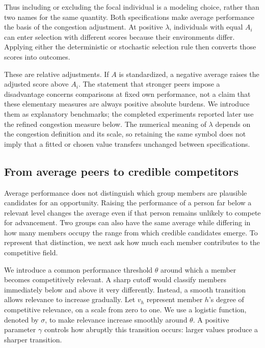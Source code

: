 Thus including or excluding the focal individual is a modeling choice, rather than two names for the same quantity. Both specifications make average performance the basis of the congestion adjustment. At positive \(\lambda\), individuals with equal \(A_i\) can enter selection with different scores because their environments differ. Applying either the deterministic or stochastic selection rule then converts those scores into outcomes.

These are relative adjustments. If \(A\) is standardized, a negative average raises the adjusted score above \(A_i\). The statement that stronger peers impose a disadvantage concerns comparisons at fixed own performance, not a claim that these elementary measures are always positive absolute burdens. We introduce them as explanatory benchmarks; the completed experiments reported later use the refined congestion measure below. The numerical meaning of \(\lambda\) depends on the congestion definition and its scale, so retaining the same symbol does not imply that a fitted or chosen value transfers unchanged between specifications.

\subsection{From average peers to credible competitors}\label{from-average-peers-to-credible-competitors}

Average performance does not distinguish which group members are plausible candidates for an opportunity. Raising the performance of a person far below a relevant level changes the average even if that person remains unlikely to compete for advancement. Two groups can also have the same average while differing in how many members occupy the range from which credible candidates emerge. To represent that distinction, we next ask how much each member contributes to the competitive field.

We introduce a common performance threshold \(\theta\) around which a member becomes competitively relevant. A sharp cutoff would classify members immediately below and above it very differently. Instead, a smooth transition allows relevance to increase gradually. Let \(v_h\) represent member \(h\)'s degree of competitive relevance, on a scale from zero to one. We use a logistic function, denoted by \(\sigma\), to make relevance increase smoothly around \(\theta\). A positive parameter \(\gamma\) controls how abruptly this transition occurs: larger values produce a sharper transition.

